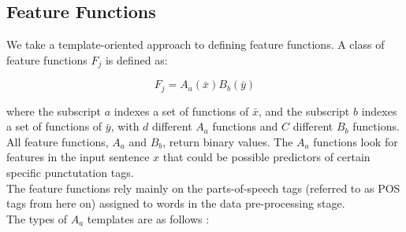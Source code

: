 \documentclass[11pt,a4paper,oneside]{article}
\begin{document}
\subsection{Feature Functions}

We take a template-oriented approach to defining feature functions. A class of feature functions $F_j$ is defined as:

\begin{equation}
F_j = A_a(\bar{x})B_b(\bar{y})
\end{equation}

where the subscript $a$ indexes a set of functions of $\bar{x}$, and the subscript $b$ indexes a set of functions of $\bar{y}$, with $d$ different $A_a$ functions and $C$ different $B_b$ functions.\\

All feature functions, $A_a$ and $B_b$, return binary values. The $A_a$ functions look for features in the input sentence $x$ that could be possible predictors of certain specific punctutation tags. \\

The feature functions rely mainly on the parts-of-speech tags (referred to as POS tags from here on) assigned to words in the data pre-processing stage.\\

The types of $A_a$ templates are as follows :
\end{document}
